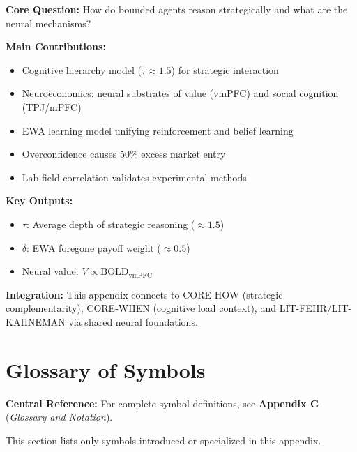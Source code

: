 \begin{tcolorbox}[colback=green!10!white, colframe=green!75!black,
    title=\textbf{Appendix CA: Summary}]

\textbf{Core Question:} How do bounded agents reason strategically and what are the neural mechanisms?

\textbf{Main Contributions:}
\begin{itemize}[nosep]
    \item Cognitive hierarchy model ($\tau \approx 1.5$) for strategic interaction
    \item Neuroeconomics: neural substrates of value (vmPFC) and social cognition (TPJ/mPFC)
    \item EWA learning model unifying reinforcement and belief learning
    \item Overconfidence causes 50\% excess market entry
    \item Lab-field correlation validates experimental methods
\end{itemize}

\textbf{Key Outputs:}
\begin{itemize}[nosep]
    \item $\tau$: Average depth of strategic reasoning ($\approx 1.5$)
    \item $\delta$: EWA foregone payoff weight ($\approx 0.5$)
    \item Neural value: $V \propto \text{BOLD}_{\text{vmPFC}}$
\end{itemize}

\textbf{Integration:} This appendix connects to CORE-HOW (strategic complementarity),
CORE-WHEN (cognitive load context), and LIT-FEHR/LIT-KAHNEMAN via shared neural foundations.

\end{tcolorbox}


\section{Glossary of Symbols}
\label{sec:ca-glossary}

\begin{tcolorbox}[colback=blue!5!white, colframe=blue!75!black]
\textbf{Central Reference:} For complete symbol definitions, see
\textbf{Appendix G} (\textit{Glossary and Notation}).

This section lists only symbols introduced or specialized in this appendix.
\end{tcolorbox}

